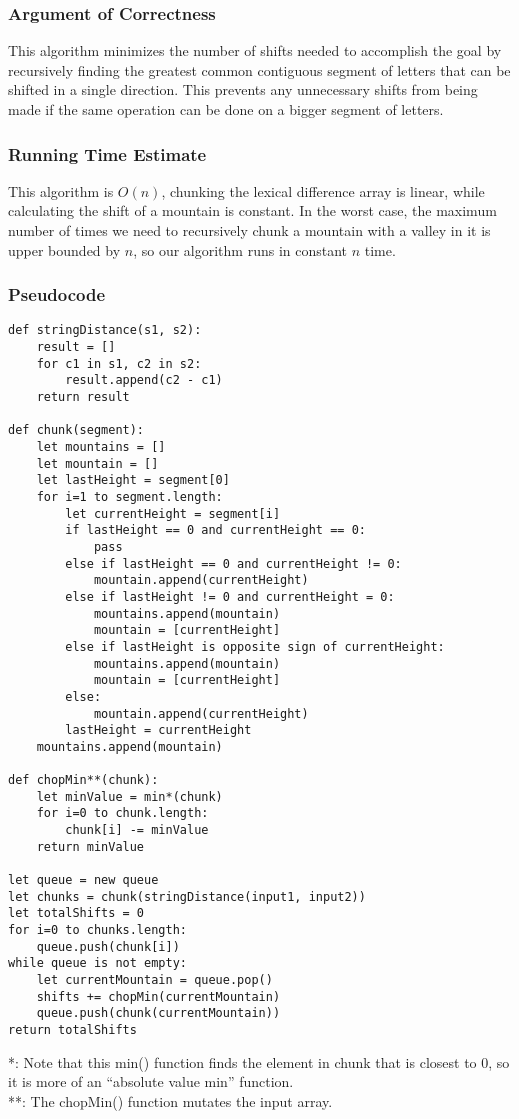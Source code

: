 \documentclass[letterpaper, 12pt]{math}
\begin{document}
\subsubsection*{Argument of Correctness}
This algorithm minimizes the number of shifts needed to accomplish the goal by
recursively finding the greatest common contiguous segment of letters that can
be shifted in a single direction. This prevents any unnecessary shifts from
being made if the same operation can be done on a bigger segment of letters.

\subsubsection*{Running Time Estimate}
This algorithm is \( O(n) \), chunking the lexical difference array is linear,
while calculating the shift of a mountain is constant. In the worst case, the
maximum number of times we need to recursively chunk a mountain with a valley
in it is upper bounded by \( n \), so our algorithm runs in constant \( n \)
time.

\subsubsection*{Pseudocode}
\begin{lstlisting}
def stringDistance(s1, s2):
    result = []
    for c1 in s1, c2 in s2:
        result.append(c2 - c1)
    return result

def chunk(segment):
    let mountains = []
    let mountain = []
    let lastHeight = segment[0]
    for i=1 to segment.length:
        let currentHeight = segment[i]
        if lastHeight == 0 and currentHeight == 0:
            pass
        else if lastHeight == 0 and currentHeight != 0:
            mountain.append(currentHeight)
        else if lastHeight != 0 and currentHeight = 0:
            mountains.append(mountain)
            mountain = [currentHeight]
        else if lastHeight is opposite sign of currentHeight:
            mountains.append(mountain)
            mountain = [currentHeight]
        else:
            mountain.append(currentHeight)
        lastHeight = currentHeight
    mountains.append(mountain)

def chopMin**(chunk):
    let minValue = min*(chunk)
    for i=0 to chunk.length:
        chunk[i] -= minValue
    return minValue

let queue = new queue
let chunks = chunk(stringDistance(input1, input2))
let totalShifts = 0
for i=0 to chunks.length:
    queue.push(chunk[i])
while queue is not empty:
    let currentMountain = queue.pop()
    shifts += chopMin(currentMountain)
    queue.push(chunk(currentMountain))
return totalShifts
\end{lstlisting}
*: Note that this min() function finds the element in chunk that is closest to
0, so it is more of an ``absolute value min'' function. \\
**: The chopMin() function mutates the input array. \\
\end{document}
